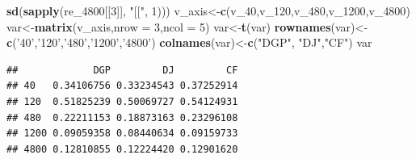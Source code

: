 \documentclass[
]{article}
\newenvironment{Shaded}{\begin{snugshade}}{\end{snugshade}}
\newcommand{\DataTypeTok}[1]{\textcolor[rgb]{0.13,0.29,0.53}{#1}}
\newcommand{\DecValTok}[1]{\textcolor[rgb]{0.00,0.00,0.81}{#1}}
\newcommand{\KeywordTok}[1]{\textcolor[rgb]{0.13,0.29,0.53}{\textbf{#1}}}
\newcommand{\NormalTok}[1]{#1}
\newcommand{\StringTok}[1]{\textcolor[rgb]{0.31,0.60,0.02}{#1}}
\begin{document}
\begin{Shaded}
\begin{Highlighting}[]
        \KeywordTok{sd}\NormalTok{(}\KeywordTok{sapply}\NormalTok{(re_}\DecValTok{4800}\NormalTok{[[}\DecValTok{3}\NormalTok{]], }\StringTok{"[["}\NormalTok{, }\DecValTok{1}\NormalTok{)))}
\NormalTok{v_axis<-}\KeywordTok{c}\NormalTok{(v_}\DecValTok{40}\NormalTok{,v_}\DecValTok{120}\NormalTok{,v_}\DecValTok{480}\NormalTok{,v_}\DecValTok{1200}\NormalTok{,v_}\DecValTok{4800}\NormalTok{)}
\NormalTok{var<-}\KeywordTok{matrix}\NormalTok{(v_axis,}\DataTypeTok{nrow =} \DecValTok{3}\NormalTok{,}\DataTypeTok{ncol =} \DecValTok{5}\NormalTok{)}
\NormalTok{var<-}\KeywordTok{t}\NormalTok{(var)}
\KeywordTok{rownames}\NormalTok{(var)<-}\KeywordTok{c}\NormalTok{(}\StringTok{'40'}\NormalTok{,}\StringTok{'120'}\NormalTok{,}\StringTok{'480'}\NormalTok{,}\StringTok{'1200'}\NormalTok{,}\StringTok{'4800'}\NormalTok{)}
\KeywordTok{colnames}\NormalTok{(var)<-}\KeywordTok{c}\NormalTok{(}\StringTok{"DGP"}\NormalTok{, }\StringTok{"DJ"}\NormalTok{,}\StringTok{"CF"}\NormalTok{)}
\NormalTok{var}
\end{Highlighting}
\end{Shaded}

\begin{verbatim}
##             DGP         DJ         CF
## 40   0.34106756 0.33234543 0.37252914
## 120  0.51825239 0.50069727 0.54124931
## 480  0.22211153 0.18873163 0.23296108
## 1200 0.09059358 0.08440634 0.09159733
## 4800 0.12810855 0.12224420 0.12901620
\end{verbatim}
\end{document}

